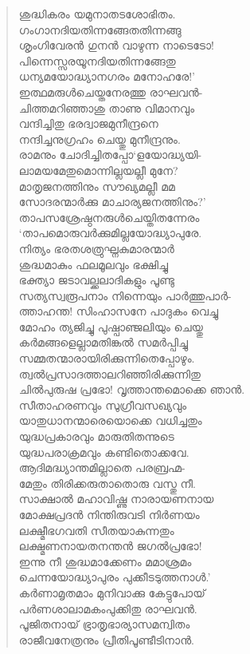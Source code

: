 \begin{verse}
ശുദ്ധികരം യമുനാതടശോഭിതം.\\
ഗംഗാനദിയതിന്നങ്ങേതതിന്നങ്ങു\\
ശൃംഗിവേരന്‍ ഗുനന്‍ വാഴുന്ന നാടെടോ!\\
പിന്നെസ്സരയൂനദിയതിന്നങ്ങേതു\\
ധന്യമയോദ്ധ്യാനഗരം മനോഹരേ!’\\
ഇത്ഥമരുള്‍ചെയ്തനേരത്തു രാഘവന്‍-\\
ചിത്തമറിഞ്ഞാശു താണു വിമാനവും\\
വന്ദിച്ചിതു ഭരദ്വാജമുനീന്ദ്രനെ\\
നന്ദിച്ചനുഗ്രഹം ചെയ്തു മുനീന്ദ്രനും.\\
രാമനും ചോദിച്ചിതപ്പോ‘ളയോദ്ധ്യയി-\\
ലാമയമേതുമൊന്നില്ലയല്ലീ മുനേ?\\
മാതൃജനത്തിനും സൗഖ്യമല്ലീ മമ\\
സോദരന്മാര്‍ക്കു മാചാര്യജനത്തിനും?’\\
താപസശ്രേഷ്ഠനരുള്‍ചെയ്തിതന്നേരം\\
‘താപമൊരുവര്‍ക്കുമില്ലയോദ്ധ്യാപുരേ.\\
നിത്യം ഭരതശത്രുഘ്നകുമാരന്മാര്‍\\
ശുദ്ധമാകും ഫലമൂലവും ഭക്ഷിച്ചു\\
ഭക്ത്യാ ജടാവല്ക്കലാദികളും പൂണ്ടു\\
സത്യസ്വരൂപനാം നിന്നെയും പാര്‍ത്തുപാര്‍-\\
ത്താഹന്ത! സിംഹാസനേ പാദുകം വെച്ചു\\
മോഹം ത്യജിച്ചു പുഷ്പാഞ്ജലിയും ചെയ്തു\\
കര്‍മങ്ങളെല്ലാമതിങ്കല്‍ സമര്‍പ്പിച്ചു\\
സമ്മതന്മാരായിരിക്കുന്നിതെപ്പോഴും.\\
ത്വല്‍പ്രസാദത്താലറിഞ്ഞിരിക്കുന്നിതു\\
ചില്‍പുരുഷ പ്രഭോ! വൃത്താന്തമൊക്കെ ഞാന്‍.\\
സീതാഹരണവും സുഗ്രീവസഖ്യവും\\
യാതുധാനന്മാരെയൊക്കെ വധിച്ചതും\\
യുദ്ധപ്രകാരവും മാരുതിതന്നുടെ\\
യുദ്ധപരാക്രമവും കണ്ടിതൊക്കവേ.\\
ആദിമദ്ധ്യാന്തമില്ലാതെ പരബ്രഹ്മ-\\
മേതും തിരിക്കരുതാതൊരു വസ്തു നീ.\\
സാക്ഷാല്‍ മഹാവിഷ്ണു നാരായണനായ\\
മോക്ഷപ്രദന്‍ നിന്തിരുവടി നിര്‍ണയം\\
ലക്ഷ്മീഭഗവതി സീതയാകുന്നതും\\
ലക്ഷ്മണനായതനന്തന്‍ ജഗല്‍പ്രഭോ!\\
ഇന്നു നീ ശുദ്ധമാക്കേണം മമാശ്രമം\\
ചെന്നയോദ്ധ്യാപുരം പുക്കീടടുത്തനാള്‍.’\\
കര്‍ണാമൃതമാം മുനിവാക്കു കേട്ടുപോയ്\\
പര്‍ണശാലാമകംപുക്കിതു രാഘവന്‍.\\
പൂജിതനായ് ഭ്രാതൃഭാര്യാസമന്വിതം\\
രാജീവനേത്രനും പ്രീതിപൂണ്ടീടിനാന്‍.
\end{verse}

